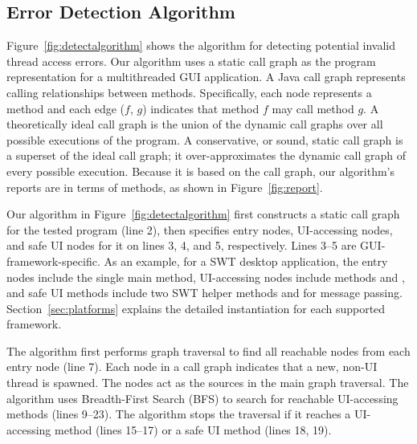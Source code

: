 \subsection{Error Detection Algorithm}
\label{sec:algorithm}

Figure~\ref{fig:detectalgorithm} shows the algorithm for detecting
potential invalid thread access errors. Our algorithm uses a
static call graph as the program representation for a multithreaded
GUI application. A Java call graph represents calling relationships
between methods. Specifically, each node represents a method and each
edge ($f$, $g$) indicates that method $f$ may call method $g$.
A theoretically ideal call graph is the union of the
dynamic call graphs over all possible executions of the program. 
A conservative, or sound, static call graph is a superset of
the ideal call graph; it over-approximates the
dynamic call graph of every possible execution. 
Because it is 
based on the call graph, our algorithm's reports are in terms of methods, as shown in Figure~\ref{fig:report}.



Our algorithm in Figure~\ref{fig:detectalgorithm} %
first constructs a static call graph for the tested program (line 2),
then specifies entry nodes, UI-accessing nodes, and safe UI nodes
for it on lines 3, 4, and 5, respectively. Lines 3--5 are GUI-framework-specific.
As an example, for a SWT desktop application, the entry nodes include
the single main method, UI-accessing nodes include methods
 and ,
and safe UI methods include two SWT helper methods   and
 for message passing. Section~\ref{sec:platforms}
explains the detailed instantiation for each supported framework.

The algorithm first performs graph traversal to find
all reachable 
nodes from each entry node (line 7).
Each  node in a call graph indicates that a new,
non-UI thread is spawned.  The 
nodes act as the sources in the main graph traversal.
The algorithm uses Breadth-First Search (BFS) to search for reachable UI-accessing
methods (lines 9--23).
The algorithm stops the traversal if it reaches a UI-accessing
method (lines 15--17) or a safe UI method (lines 18, 19).

